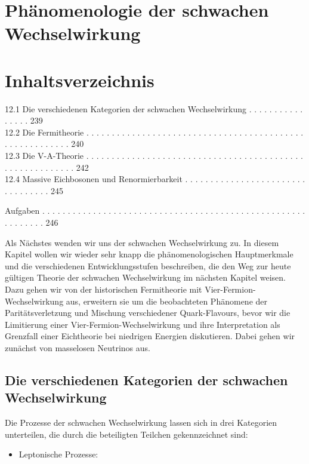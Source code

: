 \documentclass[10pt, letterpaper]{article}
\begin{document}
\section*{Phänomenologie der schwachen Wechselwirkung}
\section*{Inhaltsverzeichnis}
12.1 Die verschiedenen Kategorien der schwachen Wechselwirkung . . . . . . . . . . . . . . . . 239\\
12.2 Die Fermitheorie . . . . . . . . . . . . . . . . . . . . . . . . . . . . . . . . . . . . . . . . . . . . . . . . . . . . . . . . 240\\
12.3 Die V-A-Theorie . . . . . . . . . . . . . . . . . . . . . . . . . . . . . . . . . . . . . . . . . . . . . . . . . . . . . . . . . 242\\
12.4 Massive Eichbosonen und Renormierbarkeit . . . . . . . . . . . . . . . . . . . . . . . . . . . . . . . . . 245

Aufgaben . . . . . . . . . . . . . . . . . . . . . . . . . . . . . . . . . . . . . . . . . . . . . . . . . . . . . . . . . . . . 246

Als Nächstes wenden wir uns der schwachen Wechselwirkung zu. In diesem Kapitel wollen wir wieder sehr knapp die phänomenologischen Hauptmerkmale und die verschiedenen Entwicklungsstufen beschreiben, die den Weg zur heute gültigen Theorie der schwachen Wechselwirkung im nächsten Kapitel weisen. Dazu gehen wir von der historischen Fermitheorie mit Vier-Fermion-Wechselwirkung aus, erweitern sie um die beobachteten Phänomene der Paritätsverletzung und Mischung verschiedener Quark-Flavours, bevor wir die Limitierung einer Vier-Fermion-Wechselwirkung und ihre Interpretation als Grenzfall einer Eichtheorie bei niedrigen Energien diskutieren. Dabei gehen wir zunächst von masselosen Neutrinos aus.

\subsection*{Die verschiedenen Kategorien der schwachen Wechselwirkung}
Die Prozesse der schwachen Wechselwirkung lassen sich in drei Kategorien unterteilen, die durch die beteiligten Teilchen gekennzeichnet sind:

\begin{itemize}
  \item Leptonische Prozesse:
\end{itemize}
\end{document}
